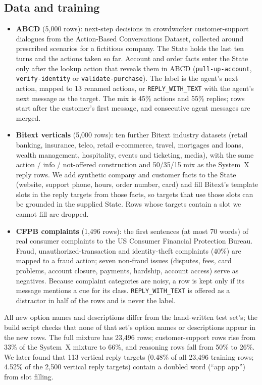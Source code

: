 \documentclass[11pt]{article}
\newcommand{\reply}{\texttt{REPLY\_WITH\_TEXT}}
\begin{document}
\subsection{Data and training}
\begin{itemize}
\item \textbf{ABCD} \citep{chen2021abcd} (5{,}000 rows): next-step decisions in crowdworker customer-support dialogues from the Action-Based Conversations Dataset, collected around prescribed scenarios for a fictitious company. The State holds the last ten turns and the actions taken so far. Account and order facts enter the State only after the lookup action that reveals them in ABCD (\texttt{pull-up-account}, \texttt{verify-identity} or \texttt{validate-purchase}). The label is the agent's next action, mapped to 13 renamed actions, or \reply{} with the agent's next message as the target. The mix is 45\% actions and 55\% replies; rows start after the customer's first message, and consecutive agent messages are merged.
\item \textbf{Bitext verticals} \citep{bitextverticals2024} (5{,}000 rows): ten further Bitext industry datasets (retail banking, insurance, telco, retail e-commerce, travel, mortgages and loans, wealth management, hospitality, events and ticketing, media), with the same action / info / not-offered construction and 50/35/15 mix as the System~X reply rows. We add synthetic company and customer facts to the State (website, support phone, hours, order number, card) and fill Bitext's template slots in the reply targets from those facts, so targets that use those slots can be grounded in the supplied State. Rows whose targets contain a slot we cannot fill are dropped.
\item \textbf{CFPB complaints} \citep{cfpb2026} (1{,}496 rows): the first sentences (at most 70 words) of real consumer complaints to the US Consumer Financial Protection Bureau. Fraud, unauthorized-transaction and identity-theft complaints (40\%) are mapped to a fraud action; seven non-fraud issues (disputes, fees, card problems, account closure, payments, hardship, account access) serve as negatives. Because complaint categories are noisy, a row is kept only if its message mentions a cue for its class. \reply{} is offered as a distractor in half of the rows and is never the label.
\end{itemize}
All new option names and descriptions differ from the hand-written test set's; the build script checks that none of that set's option names or descriptions appear in the new rows. The full mixture has 23{,}496 rows; customer-support rows rise from 33\% of the System~X mixture to 66\%, and reasoning rows fall from 50\% to 26\%. We later found that 113 vertical reply targets (0.48\% of all 23{,}496 training rows; 4.52\% of the 2{,}500 vertical reply targets) contain a doubled word (``app app'') from slot filling.
\end{document}
